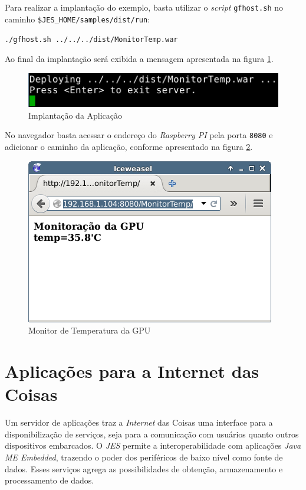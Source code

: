 Para realizar a implantação do exemplo, basta utilizar o \textit{script}
\verb|gfhost.sh| no caminho \verb|$JES_HOME/samples/dist/run|:

\verb|./gfhost.sh ../../../dist/MonitorTemp.war|

Ao final da implantação será exibida a mensagem apresentada na figura
\ref{fig:java-me/java-jes-deploy}.

\begin{figure}[H]
    \centering
    \includegraphics[width=0.7\linewidth]{figuras/java/java-jes-deploy.png}
    \caption{Implantação da Aplicação}
    \label{fig:java-me/java-jes-deploy}
\end{figure}

No navegador basta acessar o endereço do \textit{Raspberry PI} pela porta
\verb|8080| e adicionar o caminho da aplicação, conforme apresentado na figura
\ref{fig:java-me/java-jes-browser}.

\begin{figure}[H]
    \centering
    \includegraphics[width=0.7\linewidth]{figuras/java/java-jes-browser.png}
    \caption{Monitor de Temperatura da GPU}
    \label{fig:java-me/java-jes-browser}
\end{figure}

\section{Aplicações para a Internet das Coisas}

Um servidor de aplicações traz a \textit{Internet} das Coisas uma interface
para a disponibilização de serviços, seja para a comunicação com usuários
quanto outros dispositivos embarcados. O \textit{JES} permite a
interoperabilidade com aplicações \textit{Java ME Embedded}, trazendo o poder
dos periféricos de baixo nível como fonte de dados. Esses serviços agrega as
possibilidades de obtenção, armazenamento e processamento de dados.


